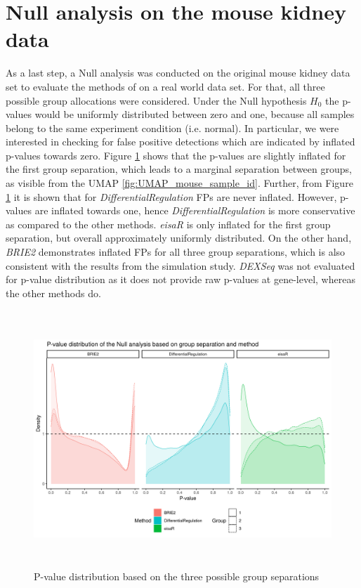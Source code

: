 \section{Null analysis on the mouse kidney data}
As a last step, a Null analysis was conducted on the original mouse kidney data set to evaluate the methods of on a real world data set. For that, all three possible group allocations were considered. Under the Null hypothesis $H_0$ the p-values would be uniformly distributed between zero and one, because all samples belong to the same experiment condition (i.e. normal). In particular, we were interested in checking for false positive detections which are indicated by inflated p-values towards zero. Figure \ref{fig:null_p_values} shows that the p-values are slightly inflated for the first group separation, which leads to a marginal separation between groups, as visible from the UMAP \ref{fig:UMAP_mouse_sample_id}. Further, from Figure \ref{fig:null_p_values} it is shown that for \emph{DifferentialRegulation} FPs are never inflated. However, p-values are inflated towards one, hence \emph{DifferentialRegulation} is more conservative as compared to the other methods. \emph{eisaR} is only inflated for the first group separation, but overall approximately uniformly distributed. On the other hand, \emph{BRIE2} demonstrates inflated FPs for all three group separations, which is also consistent with the results from the simulation study. \emph{DEXSeq} was not evaluated for p-value distribution as it does not provide raw p-values at gene-level, whereas the other methods do.

\begin{figure}[!htb]
\begin{center}
\includegraphics[width=6in,height=3.8in]{../figures/null_analysis/p_value_distribution.png}
\end{center}
\caption{P-value distribution based on the three possible group separations}
\label{fig:null_p_values}
\end{figure}

